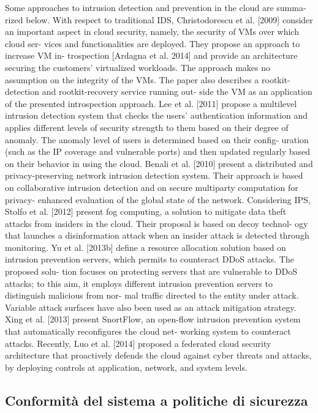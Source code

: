 \documentclass[../main.tex]{subfiles}
\begin{document}
Some approaches to intrusion detection and prevention in the cloud are summa-
rized below. With respect to traditional IDS, Christodorescu et al. [2009] consider an
important aspect in cloud security, namely, the security of VMs over which cloud ser-
vices and functionalities are deployed. They propose an approach to increase VM in-
trospection [Ardagna et al. 2014] and provide an architecture securing the customers’
virtualized workloads. The approach makes no assumption on the integrity of the VMs.
The paper also describes a rootkit-detection and rootkit-recovery service running out-
side the VM as an application of the presented introspection approach. Lee et al. [2011]
propose a multilevel intrusion detection system that checks the users’ authentication
information and applies different levels of security strength to them based on their
degree of anomaly. The anomaly level of users is determined based on their config-
uration (such as the IP coverage and vulnerable ports) and then updated regularly
based on their behavior in using the cloud. Benali et al. [2010] present a distributed
and privacy-preserving network intrusion detection system. Their approach is based
on collaborative intrusion detection and on secure multiparty computation for privacy-
enhanced evaluation of the global state of the network.
Considering IPS, Stolfo et al. [2012] present fog computing, a solution to mitigate
data theft attacks from insiders in the cloud. Their proposal is based on decoy technol-
ogy that launches a disinformation attack when an insider attack is detected through
monitoring. Yu et al. [2013b] define a resource allocation solution based on intrusion
prevention servers, which permits to counteract DDoS attacks. The proposed solu-
tion focuses on protecting servers that are vulnerable to DDoS attacks; to this aim,
it employs different intrusion prevention servers to distinguish malicious from nor-
mal traffic directed to the entity under attack. Variable attack surfaces have also
been used as an attack mitigation strategy. Xing et al. [2013] present SnortFlow, an
open-flow intrusion prevention system that automatically reconfigures the cloud net-
working system to counteract attacks. Recently, Luo et al. [2014] proposed a federated
cloud security architecture that proactively defends the cloud against cyber threats
and attacks, by deploying controls at application, network, and system levels.




\subsection{Conformità del sistema a politiche di sicurezza}
\end{document}
